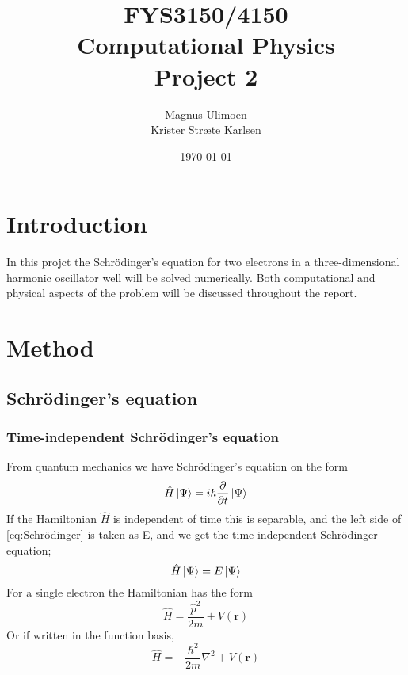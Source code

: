 \documentclass[11pt,a4paper,english,draft]{article}
\title{FYS3150/4150\\Computational Physics\\Project 2}
\author{Magnus Ulimoen\\Krister Stræte Karlsen}
\date{\today}
\numberwithin{equation}{section}
\newcommand{\ve}[1]{\mathbf{#1}} %
\let\oldhat\hat
\renewcommand{\hat}[1]{\oldhat{#1}}
\begin{document}
\maketitle

\section{Introduction}

In this projct the Schrödinger's equation for two electrons in a
three-dimensional harmonic oscillator well will be solved numerically. 
Both computational and physical aspects of the problem will be discussed 
throughout the report. 


\section{Method}

\subsection{Schrödinger's equation}


\subsubsection{Time-independent Schrödinger's equation}
From quantum mechanics we have Schrödinger's equation on the form
\begin{equation}
\hat{H} \ket{\Psi} = i\hbar \frac{\partial }{\partial t} \ket{\Psi}
\label{eq:Schrödinger}
\end{equation}
If the Hamiltonian $\hat{H}$ is independent of time this is separable,
and the left side of \eqref{eq:Schrödinger} is taken as E, and we get the
time-independent Schrödinger equation;
\begin{equation}
 \hat{H}\ket{\Psi} = E\ket{\Psi}
\end{equation}
For a single electron the Hamiltonian has the form 
\begin{equation}
\hat{H} = \frac{\hat{p}^2}{2m} + V(\ve{r})
\end{equation}
Or if written in the function basis,
\begin{equation}
\hat{H} = -\frac{\hbar^2}{2m}\nabla^2 + V(\ve{r})
\label{eq:Hamiltonian}
\end{equation}
\end{document}

